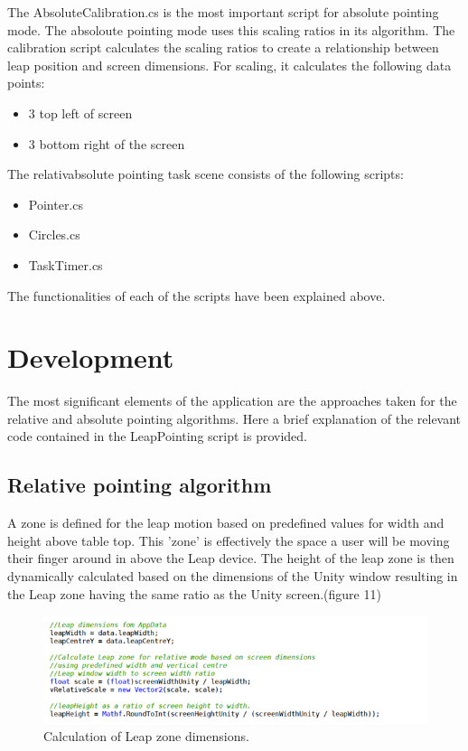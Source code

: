 \documentclass{article}
\begin{document}
The AbsoluteCalibration.cs is the most important script for absolute pointing mode. The absoloute pointing mode uses this scaling ratios in its algorithm. The calibration script calculates the scaling ratios to create a relationship between leap position and screen dimensions. For scaling, it calculates the following data points:

\begin{itemize}
    \item 3 top left of screen
    \item 3 bottom right of the screen

\end{itemize}


The relativabsolute pointing task scene consists of the following scripts:

\begin{itemize}
    \item Pointer.cs
    \item Circles.cs
    \item TaskTimer.cs
    
\end{itemize}

The functionalities of each of the scripts have been explained above.

\section{Development}

The most significant elements of the application are the approaches taken for the relative and absolute pointing algorithms. Here a brief explanation of the relevant code contained in the LeapPointing script is provided.

\subsection{Relative pointing algorithm}
A zone is defined for the leap motion based on predefined values for width and height above table top. This 'zone' is effectively the space a user will be moving their finger around in above the Leap device. The height of the leap zone is then dynamically calculated based on the dimensions of the Unity window resulting in the Leap zone having the same ratio as the Unity screen.(figure 11)

\begin{figure}[!h]
    \centering
    \includegraphics[width=7.0in]{Figure_10}
    \caption{Calculation of Leap zone dimensions.}
\end{figure}
\end{document}
